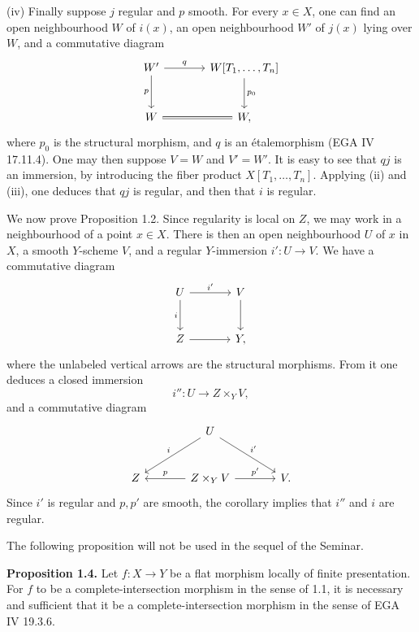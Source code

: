 \documentclass[11pt]{article}
\providecommand{\etale}{\'etale}
\begin{document}
(iv) Finally suppose $j$ regular and $p$ smooth. For every $x\in X$, one can find an open neighbourhood $W$ of $i(x)$, an open neighbourhood $W'$ of $j(x)$ lying over $W$, and a commutative diagram
\[
\begin{tikzcd}[column sep=large,row sep=large]
W' \arrow[r,"q"] \arrow[d,"p"'] & W[T_1,\ldots,T_n] \arrow[d,"p_0"]\\
W \arrow[r,equal] & W,
\end{tikzcd}
\]
where $p_0$ is the structural morphism, and $q$ is an \etale morphism (EGA IV 17.11.4). One may then suppose $V=W$ and $V'=W'$. It is easy to see that $qj$ is an immersion, by introducing the fiber product $X[T_1,\ldots,T_n]$. Applying (ii) and (iii), one deduces that $qj$ is regular, and then that $i$ is regular.

We now prove Proposition 1.2. Since regularity is local on $Z$, we may work in a neighbourhood of a point $x\in X$. There is then an open neighbourhood $U$ of $x$ in $X$, a smooth $Y$-scheme $V$, and a regular $Y$-immersion $i':U\to V$. We have a commutative diagram
\[
\begin{tikzcd}[column sep=large,row sep=large]
U \arrow[r,"i'"] \arrow[d,"i"'] & V \arrow[d]\\
Z \arrow[r] & Y,
\end{tikzcd}
\]
where the unlabeled vertical arrows are the structural morphisms. From it one deduces a closed immersion
\[
i'':U\longrightarrow Z\times_Y V,
\]
and a commutative diagram
\[
\begin{tikzcd}[column sep=large,row sep=large]
& U \arrow[dl,"i"'] \arrow[dr,"i'"] &\\
Z & Z\times_Y V \arrow[l,"p"'] \arrow[r,"p'"] & V.
\end{tikzcd}
\]
Since $i'$ is regular and $p,p'$ are smooth, the corollary implies that $i''$ and $i$ are regular.

The following proposition will not be used in the sequel of the Seminar.

\textbf{Proposition 1.4.} Let $f:X\to Y$ be a flat morphism locally of finite presentation. For $f$ to be a complete-intersection morphism in the sense of 1.1, it is necessary and sufficient that it be a complete-intersection morphism in the sense of EGA IV 19.3.6.
\end{document}
